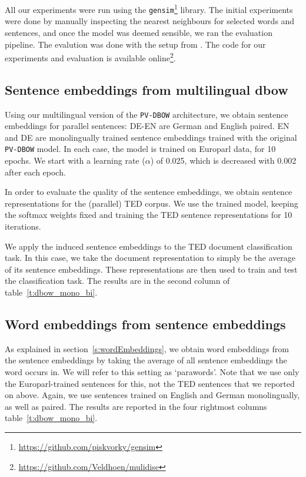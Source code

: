 All our experiments were run using the \texttt{gensim}\footnote{\url{https://github.com/piskvorky/gensim}} library.
The initial experiments were done by manually inspecting the nearest neighbours for selected words and sentences, and once the model was deemed sensible, we ran the evaluation pipeline.
The evalution was done with the setup from \cite{klementiev2012inducing}.
The code for our experiments and evaluation is available online\footnote{\url{https://github.com/Veldhoen/mulidise}}.


\subsection{Sentence embeddings from multilingual dbow}

Using our multilingual version of the {\tt PV-DBOW} architecture, we obtain sentence embeddings for parallel sentences: DE-EN are German and English paired. EN and DE are monolingually trained sentence embeddings trained with the original {\tt PV-DBOW} model. In each case, the model is trained on Europarl data, for 10 epochs. We start with a learning rate ($\alpha$) of 0.025, which is decreased with 0.002 after each epoch.

 In order to evaluate the quality of the sentence embeddings, we obtain sentence representations for the (parallel) TED corpus. We use the trained model, keeping the softmax weights fixed and training the TED sentence representations for 10 iterations.

We apply the induced sentence embeddings to the TED document classification task. In this case, we take the document representation to simply be the average of its sentence embeddings. These representations are then used to train and test the classification task. The results are in the second column of table~\ref{t:dbow_mono_bi}. 




\subsection{Word embeddings from sentence embeddings}

As explained in section~\ref{s:wordEmbeddings}, we obtain word embeddings from the sentence embeddings by taking the average of all sentence embeddings the word occurs in. We will refer to this setting as `parawords'. Note that we use only the Europarl-trained sentences for this, not the TED sentences that we reported on above. Again, we use sentences trained on English and German monolingually, as well as paired. The results are reported in the four rightmost columns table~\ref{t:dbow_mono_bi}.

